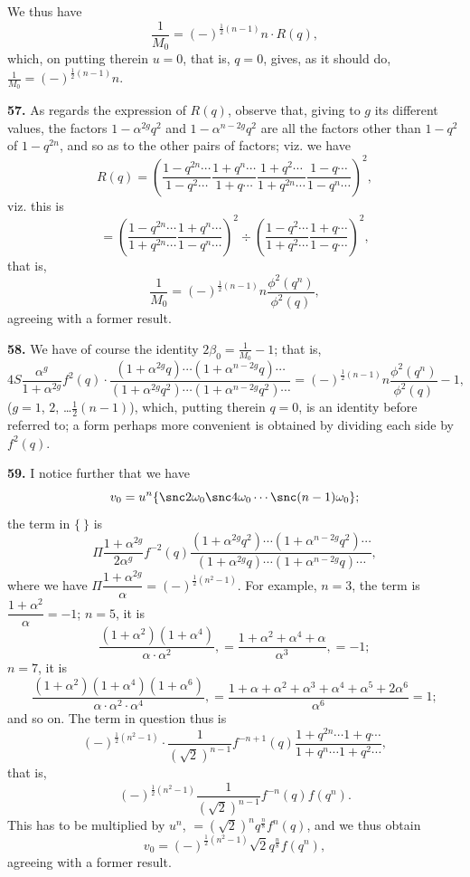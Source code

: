 \documentclass[11pt,a4paper]{book}
\begin{document}
We thus have
\[
\frac{1}{M_0} = (-)^{\frac{1}{2}(n-1)} n \cdot R(q),
\]
which, on putting therein $u = 0$, that is, $q = 0$, gives, as it should do, $\frac{1}{M_0} = (-)^{\frac{1}{2}(n-1)} n$.

\textbf{57.} As regards the expression of $R(q)$, observe that, giving to $g$ its different values, the factors $1 - \alpha^{2g}q^2$ and $1 - \alpha^{n-2g}q^2$ are all the factors other than $1 - q^2$ of $1 - q^{2n}$, and so as to the other pairs of factors; viz. we have
\[
R(q) = \left(
\frac{1 - q^{2n} \cdots}{1 - q^2 \cdots}
\frac{1 + q^n \cdots}{1 + q \cdots}
\frac{1 + q^2 \cdots}{1 + q^{2n} \cdots}
\frac{1 - q \cdots}{1 - q^n \cdots}
\right)^2,
\]
viz. this is
\[
= \left(
\frac{1 - q^{2n} \cdots}{1 + q^{2n} \cdots}
\frac{1 + q^n \cdots}{1 - q^n \cdots}
\right)^2 \div
\left(
\frac{1 - q^2 \cdots}{1 + q^2 \cdots}
\frac{1 + q \cdots}{1 - q \cdots}
\right)^2,
\]
that is,
\[
\frac{1}{M_0} = (-)^{\frac{1}{2}(n-1)} n \frac{\phi^2(q^n)}{\phi^2(q)},
\]
agreeing with a former result.

\textbf{58.} We have of course the identity $2\beta_0 = \frac{1}{M_0} - 1$; that is,
\[
4S\frac{\alpha^g}{1 + \alpha^{2g}} f^2(q) \cdot
\frac{(1 + \alpha^{2g}q) \cdots (1 + \alpha^{n-2g}q) \cdots}
{(1 + \alpha^{2g}q^2) \cdots (1 + \alpha^{n-2g}q^2) \cdots}
= (-)^{\frac{1}{2}(n-1)} n \frac{\phi^2(q^n)}{\phi^2(q)} - 1,
\]
($g = 1$, $2$, \ldots $\frac{1}{2}(n-1)$), which, putting therein $q = 0$, is an identity before referred to; a form perhaps more convenient is obtained by dividing each side by $f^2(q)$.

\textbf{59.} I notice further that we have
\[
v_0 = u^n\{\snc 2\omega_0 \snc 4\omega_0 \cdots \snc (n-1)\omega_0\};
\]
the term in $\{~\}$ is
\[
\Pi \frac{1 + \alpha^{2g}}{2\alpha^g} f^{-2}(q)
\frac{(1 + \alpha^{2g}q^2) \cdots (1 + \alpha^{n-2g}q^2) \cdots}
{(1 + \alpha^{2g}q) \cdots (1 + \alpha^{n-2g}q) \cdots},
\]
where we have $\Pi\dfrac{1 + \alpha^{2g}}{\alpha} = (-)^{\frac{1}{2}(n^2 - 1)}$. For example, $n = 3$, the term is $\dfrac{1 + \alpha^2}{\alpha} = -1$; $n = 5$, it is
\[
\frac{(1 + \alpha^2)(1 + \alpha^4)}{\alpha \cdot \alpha^2},
= \frac{1 + \alpha^2 + \alpha^4 + \alpha}{\alpha^3}, = -1;
\]
$n = 7$, it is
\[
\frac{(1 + \alpha^2)(1 + \alpha^4)(1 + \alpha^6)}{\alpha \cdot \alpha^2 \cdot \alpha^4},
= \frac{1 + \alpha + \alpha^2 + \alpha^3 + \alpha^4 + \alpha^5 + 2\alpha^6}{\alpha^6} = 1;
\]
and so on. The term in question thus is
\[
(-)^{\frac{1}{2}(n^2 - 1)} \cdot \frac{1}{(\sqrt{2})^{n-1}} f^{-n+1}(q)
\frac{1 + q^{2n} \cdots 1 + q \cdots}{1 + q^n \cdots 1 + q^2 \cdots},
\]
that is,
\[
(-)^{\frac{1}{2}(n^2 - 1)} \frac{1}{(\sqrt{2})^{n-1}} f^{-n}(q) f(q^n).
\]
This has to be multiplied by $u^n$, $= (\sqrt{2})^n q^{\frac{n}{8}} f^n(q)$, and we thus obtain
\[
v_0 = (-)^{\frac{1}{2}(n^2 - 1)} \sqrt{2} q^{\frac{n}{8}} f(q^n),
\]
agreeing with a former result.
\end{document}

